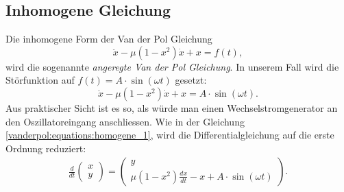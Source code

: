 \subsection{Inhomogene Gleichung}
\label{vanderpol:subsection:inhomogene}
Die inhomogene Form der Van der Pol Gleichung
\begin{equation*}
	\ddot{x}-\mu(1-x^{2}) \dot{x}+x = f(t),
\label{vanderpol:equations:inhomogene_gen}
\end{equation*}
wird die sogenannte {\em angeregte Van der Pol Gleichung}. In unserem Fall wird die Störfunktion auf $f(t) = A \cdot \sin(\omega t)$ gesetzt:
%
%
\begin{equation}
	\ddot{x}-\mu(1-x^{2}) \dot{x}+x = A \cdot \sin(\omega t).
\label{vanderpol:equations:inhomogene_sin}
\end{equation}
Aus praktischer Sicht ist es so, als würde man einen Wechselstromgenerator an den Oszillatoreingang anschliessen. Wie in der Gleichung \eqref{vanderpol:equations:homogene_1}, wird die Differentialgleichung auf die erste Ordnung reduziert:
\begin{align}
\frac{d}{dt}\begin{pmatrix}x \\ y\end{pmatrix} = \begin{pmatrix}y \\ \mu (1-x^{2}) \frac{dx}{dt}-x+A \cdot \sin(\omega t)\end{pmatrix}.
\label{vanderpol:equations:inhomogene_2}
\end{align}

